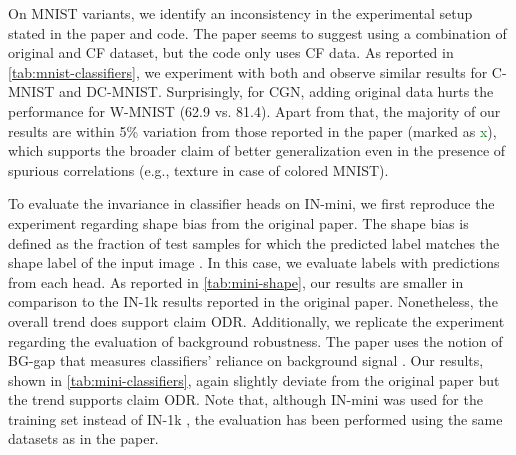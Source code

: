 On MNIST variants, we identify an inconsistency in the experimental setup stated in the paper and code.
The paper seems to suggest using a combination of original and CF dataset, but the code only uses CF data. As reported in \cref{tab:mnist-classifiers}, we experiment with both and observe similar results for C-MNIST and DC-MNIST. Surprisingly, for CGN, adding original data hurts the performance for W-MNIST (62.9 vs. 81.4). Apart from that, the majority of our results are within 5\% variation from those reported in the paper (marked as \colorbox{blue!10}{\textcolor{Green}{x}}), which supports the broader claim of better generalization even in the presence of spurious correlations (e.g., texture in case of colored MNIST).

To evaluate the invariance in classifier heads on IN-mini, we first reproduce the experiment regarding shape bias from the original paper. The shape bias is defined as the fraction of test samples for which the predicted label matches the shape label of the input image \cite{cue_conflict}. In this case, we evaluate labels with predictions from each head. As reported in \cref{tab:mini-shape}, our results are smaller in comparison to the IN-1k results reported in the original paper. Nonetheless, the overall trend does support claim ODR. Additionally, we replicate the experiment regarding the evaluation of background robustness. The paper uses the notion of BG-gap that measures classifiers' reliance on background signal \cite{bg_gap}. Our results, shown in \cref{tab:mini-classifiers}, again slightly deviate from the original paper but the trend supports claim ODR.
Note that, although IN-mini was used for the training set instead of IN-1k , the evaluation has been performed using the same datasets as in the paper.

